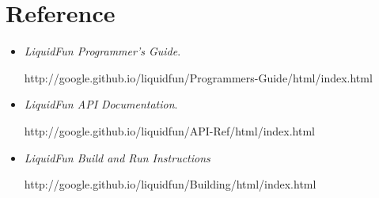 \documentclass[UTF8]{ctexart}
\begin{document}
    \section{Reference}

        \begin{itemize}
            \item \textit{LiquidFun Programmer's Guide}.

                  http://google.github.io/liquidfun/Programmers-Guide/html/index.html
                  
            \item \textit{LiquidFun API Documentation}.

                  http://google.github.io/liquidfun/API-Ref/html/index.html

            \item \textit{LiquidFun Build and Run Instructions}

                http://google.github.io/liquidfun/Building/html/index.html

        \end{itemize}
\end{document}
